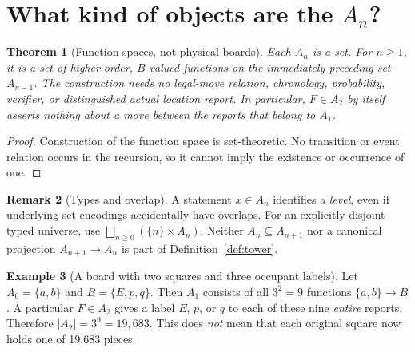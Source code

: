 \documentclass[11pt]{article}
\newtheorem{theorem}{Theorem}[section]
\theoremstyle{definition}
\newtheorem{example}[theorem]{Example}
\newtheorem{remark}[theorem]{Remark}
\begin{document}
\section{What kind of objects are the $A_n$?}
\begin{theorem}[Function spaces, not physical boards]
Each $A_n$ is a set. For $n\ge1$, it is a set of higher-order, $B$-valued functions on the immediately preceding set $A_{n-1}$. The construction needs no legal-move relation, chronology, probability, verifier, or distinguished actual location report. In particular, $F\in A_2$ by itself asserts nothing about a move between the reports that belong to $A_1$.
\end{theorem}
\begin{proof}Construction of the function space is set-theoretic. No transition or event relation occurs in the recursion, so it cannot imply the existence or occurrence of one.\end{proof}
\begin{remark}[Types and overlap]
A statement $x\in A_n$ identifies a \emph{level}, even if underlying set encodings accidentally have overlaps. For an explicitly disjoint typed universe, use $\bigsqcup_{n\ge0}(\{n\}\times A_n)$. Neither $A_n\subseteq A_{n+1}$ nor a canonical projection $A_{n+1}\to A_n$ is part of Definition~\ref{def:tower}.
\end{remark}
\begin{example}[A board with two squares and three occupant labels]
Let $A_0=\{a,b\}$ and $B=\{E,p,q\}$. Then $A_1$ consists of all $3^2=9$ functions $\{a,b\}\to B$. A particular $F\in A_2$ gives a label $E$, $p$, or $q$ to each of these nine \emph{entire} reports. Therefore $|A_2|=3^9=19{,}683$. This does \emph{not} mean that each original square now holds one of 19,683 pieces.
\end{example}
\end{document}
